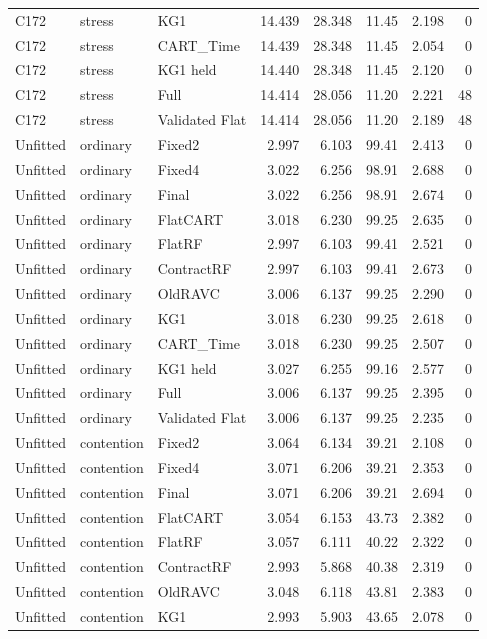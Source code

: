 \begin{longtable}{@{}lllrrrrr@{}}
C172 & stress & KG1 & 14.439 & 28.348 & 11.45 & 2.198 & 0\\
C172 & stress & CART\_Time & 14.439 & 28.348 & 11.45 & 2.054 & 0\\
C172 & stress & KG1 held & 14.440 & 28.348 & 11.45 & 2.120 & 0\\
C172 & stress & Full & 14.414 & 28.056 & 11.20 & 2.221 & 48\\
C172 & stress & Validated Flat & 14.414 & 28.056 & 11.20 & 2.189 & 48\\
Unfitted & ordinary & Fixed2 & 2.997 & 6.103 & 99.41 & 2.413 & 0\\
Unfitted & ordinary & Fixed4 & 3.022 & 6.256 & 98.91 & 2.688 & 0\\
Unfitted & ordinary & Final & 3.022 & 6.256 & 98.91 & 2.674 & 0\\
Unfitted & ordinary & FlatCART & 3.018 & 6.230 & 99.25 & 2.635 & 0\\
Unfitted & ordinary & FlatRF & 2.997 & 6.103 & 99.41 & 2.521 & 0\\
Unfitted & ordinary & ContractRF & 2.997 & 6.103 & 99.41 & 2.673 & 0\\
Unfitted & ordinary & OldRAVC & 3.006 & 6.137 & 99.25 & 2.290 & 0\\
Unfitted & ordinary & KG1 & 3.018 & 6.230 & 99.25 & 2.618 & 0\\
Unfitted & ordinary & CART\_Time & 3.018 & 6.230 & 99.25 & 2.507 & 0\\
Unfitted & ordinary & KG1 held & 3.027 & 6.255 & 99.16 & 2.577 & 0\\
Unfitted & ordinary & Full & 3.006 & 6.137 & 99.25 & 2.395 & 0\\
Unfitted & ordinary & Validated Flat & 3.006 & 6.137 & 99.25 & 2.235 & 0\\
Unfitted & contention & Fixed2 & 3.064 & 6.134 & 39.21 & 2.108 & 0\\
Unfitted & contention & Fixed4 & 3.071 & 6.206 & 39.21 & 2.353 & 0\\
Unfitted & contention & Final & 3.071 & 6.206 & 39.21 & 2.694 & 0\\
Unfitted & contention & FlatCART & 3.054 & 6.153 & 43.73 & 2.382 & 0\\
Unfitted & contention & FlatRF & 3.057 & 6.111 & 40.22 & 2.322 & 0\\
Unfitted & contention & ContractRF & 2.993 & 5.868 & 40.38 & 2.319 & 0\\
Unfitted & contention & OldRAVC & 3.048 & 6.118 & 43.81 & 2.383 & 0\\
Unfitted & contention & KG1 & 2.993 & 5.903 & 43.65 & 2.078 & 0\\

\end{longtable}

